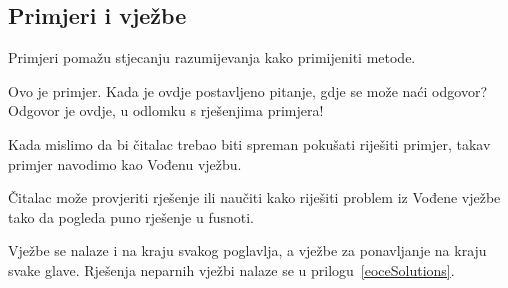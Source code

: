\subsection*{{\color{oiB}Primjeri i vježbe}}



\noindent%
Primjeri pomažu stjecanju razumijevanja kako primijeniti metode.

\begin{examplewrap}
	\begin{nexample}{Ovo je primjer.
			Kada je ovdje postavljeno pitanje, gdje se može naći odgovor?}
		Odgovor je ovdje, u odlomku s rješenjima primjera!
	\end{nexample}
\end{examplewrap}

\noindent%
Kada mislimo da bi čitalac trebao biti spreman pokušati
riješiti primjer, takav primjer navodimo kao Vođenu vježbu.

\begin{exercisewrap}
	\begin{nexercise}
		Čitalac može provjeriti rješenje ili naučiti kako riješiti problem iz Vođene vježbe
		tako da pogleda puno rješenje u fusnoti.\footnotemark{}
	\end{nexercise}
\end{exercisewrap}

\noindent%
Vježbe se nalaze i na kraju svakog poglavlja, a vježbe za ponavljanje na kraju svake glave.
Rješenja neparnih vježbi nalaze se u prilogu~\ref{eoceSolutions}.


